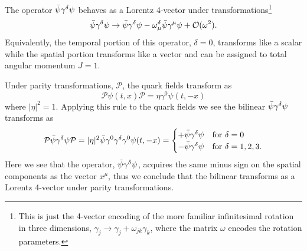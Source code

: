 The operator $\bar{\psi} \gamma^\delta \psi$ behaves as a Lorentz 4-vector under transformations\footnote{This is just the 4-vector encoding of the more familiar infinitesimal rotation in three dimensions, $\gamma_j \rightarrow \gamma_j  + \omega_{jk} \gamma_k$, where the matrix $\omega$ encodes the rotation parameters.} 
\begin{equation*}
\bar{\psi} \gamma^\delta \psi \rightarrow  \bar{\psi}\gamma^{\delta}\psi - \omega_{\mu}^\delta\bar{\psi}\gamma^{\mu}\psi + \mathcal{O}(\omega^2).
\end{equation*}
Equivalently, the temporal portion of this operator, $\delta=0$, transforms like a scalar while the spatial portion transforms like a vector and can be assigned to total angular momentum $J=1$. 

Under parity transformations, $\mathcal{P}$, the quark fields transform as
\begin{equation*}
\mathcal{P} \psi(t,x) \mathcal{P} = \eta \gamma^0 \psi(t,-x)\end{equation*}
where $|\eta|^2 =1$. Applying this rule to the quark fields we see the bilinear $\bar{\psi} \gamma^\delta \psi$ transforms as
\begin{equation*}
\mathcal{P} \bar{\psi} \gamma^\delta \psi \mathcal{P} = |\eta|^2\bar{\psi} \gamma^0 \gamma^\delta \gamma^0 \psi(t,-x)  = \begin{cases} 
+\bar{\psi} \gamma^\delta \psi &\mbox{for } \delta = 0 \\ 
-\bar{\psi} \gamma^\delta \psi &\mbox{for } \delta = 1,2,3. \\ 
\end{cases}
\end{equation*} 
Here we see that the operator, $\bar{\psi} \gamma^\delta \psi$, acquires the same minus sign on the spatial components as the vector $x^\mu$, thus we conclude that the bilinear transforms as a Lorentz 4-vector under parity transformations. 

